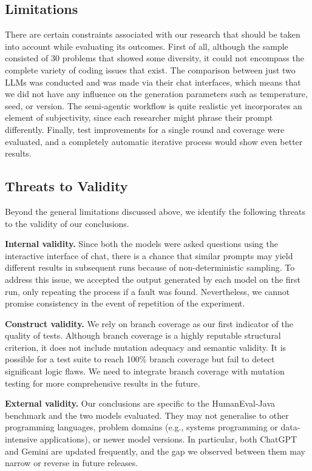 \documentclass[journal]{IEEEtran}
\begin{document}
\subsection{Limitations}
There are certain constraints associated with our research that should be taken into account while evaluating its outcomes. First of all, although the sample consisted of 30 problems that showed some diversity, it could not encompass the complete variety of coding issues that exist. The comparison between just two LLMs was conducted and was made via their chat interfaces, which means that we did not have any influence on the generation parameters such as temperature, seed, or version. The semi-agentic workflow is quite realistic yet incorporates an element of subjectivity, since each researcher might phrase their prompt differently. Finally, test improvements for a single round and coverage were evaluated, and a completely automatic iterative process would show even better results.

\subsection{Threats to Validity}
Beyond the general limitations discussed above, we identify the following threats to the validity of our conclusions.

\textbf{Internal validity.} Since both the models were asked questions using the interactive interface of chat, there is a chance that similar prompts may yield different results in subsequent runs because of non-deterministic sampling. To address this issue, we accepted the output generated by each model on the first run, only repeating the process if a fault was found. Nevertheless, we cannot promise consistency in the event of repetition of the experiment.

\textbf{Construct validity.} We rely on branch coverage as our first indicator of the quality of tests. Although branch coverage is a highly reputable structural criterion, it does not include mutation adequacy and semantic validity. It is possible for a test suite to reach 100\% branch coverage but fail to detect significant logic flaws. We need to integrate branch coverage with mutation testing for more comprehensive results in the future.

\textbf{External validity.} Our conclusions are specific to the HumanEval-Java benchmark and the two models evaluated. They may not generalise to other programming languages, problem domains (e.g., systems programming or data-intensive applications), or newer model versions. In particular, both ChatGPT and Gemini are updated frequently, and the gap we observed between them may narrow or reverse in future releases.
\end{document}
